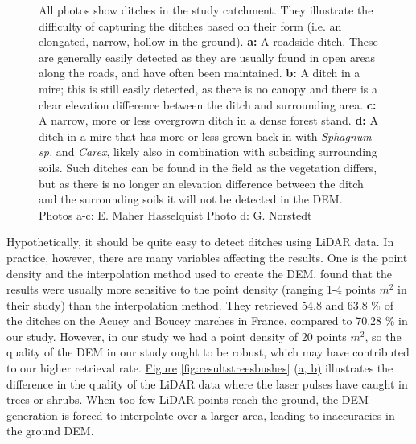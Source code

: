 \documentclass[]{interact}
\theoremstyle{plain}%
\theoremstyle{definition}
\theoremstyle{remark}
\begin{document}
\begin{figure} [!htb]
    \caption{All photos show ditches in the study catchment. They illustrate the difficulty of capturing the ditches based on their form (i.e. an elongated, narrow, hollow in the ground). \textbf{a: }A roadside ditch. These are generally easily detected as they are usually found in open areas along the roads, and have often been maintained. \textbf{b: }A ditch in a mire; this is still easily detected, as there is no canopy and there is a clear elevation difference between the ditch and surrounding area. \textbf{c: }A narrow, more or less  overgrown ditch in a dense forest stand. \textbf{d: }A ditch in a mire that has more or less grown back in with \textit{Sphagnum sp.} and \textit{Carex}, likely also in combination with subsiding surrounding soils. Such ditches can be found in the field as the vegetation differs, but as there is no longer an elevation difference between the ditch and the surrounding soils it will not be detected in the DEM. Photos a-c: E. Maher Hasselquist  Photo d: G. Norstedt}
    \label{fig:ditchpictures}
\end{figure}

Hypothetically, it should be quite easy to detect ditches using LiDAR data. In practice, however, there are many variables affecting the results. One is the point density and the interpolation method used to create the DEM. \citet{rapinel} found that the results were usually more sensitive to the point density (ranging 1-4 points $m^{2}$ in their study) than the interpolation method. They retrieved 54.8 and 63.8 \% of the ditches on the Acuey and Boucey marches in France, compared to 70.28 \% in our study. However, in our study we had a point density of 20 points $m^{2}$, so the quality of the DEM in our study ought to be robust, which may have contributed to our higher retrieval rate. \hyperref[fig:resultstreesbushes]{Figure} \ref{fig:resultstreesbushes} \hyperref[fig:resultstreesbushes]{(a, b)} illustrates the difference in the quality of the LiDAR data where the laser pulses have caught in trees or shrubs. When too few LiDAR points reach the ground, the DEM generation is forced to interpolate over a larger area, leading to inaccuracies in the ground DEM.
\end{document}
